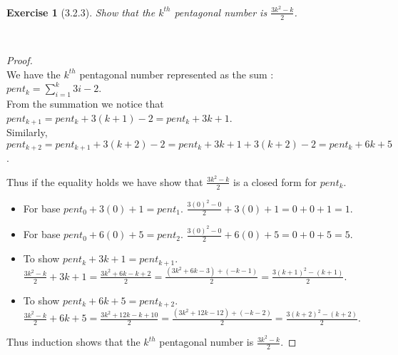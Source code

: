 \documentclass[12pt]{article}
\newcommand{\XB}{\color{black}}
\newcommand{\XBB}{\color{blue}}
\newcommand{\ds}{\displaystyle}
\theoremstyle{plain}
\newtheorem{ex}{Exercise}
\begin{document}
\newpage
\XBB\hrulefill\XB \\
\begin{ex} [3.2.3]
  Show that the $k^{th}$ pentagonal number is $ \ds \frac{3k^{2} - k}{2} $.
\end{ex}
\XBB\hrulefill\XB \\

\begin{proof}
  \ \\

  We have the $k^{th}$ pentagonal number represented as the sum : $ \ds pent_{k} = \sum_{i = 1}^{k} 3i - 2 $. \\

  From the summation we notice that $ pent_{k + 1} = pent_{k} + 3(k + 1) - 2 = pent_{k} + 3k + 1 $. \\

  Similarly, $ pent_{k + 2} = pent_{k + 1} + 3(k + 2) - 2 = pent_{k} + 3k + 1 + 3(k + 2) - 2 = pent_{k} + 6k + 5 $.

  Thus if the equality holds we have show that $ \ds \frac{3k^{2} - k}{2} $ is a closed form for $ pent_{k} $.

  \begin{itemize}
    \item For base $ pent_{0} + 3(0) + 1 = pent_{1} $.
    \subitem $ \ds \frac{3(0)^{2} - 0}{2} + 3(0) + 1 = 0 + 0 + 1 = 1 $.
    \item For base $ pent_{0} + 6(0) + 5 = pent_{2} $.
    \subitem $ \ds \frac{3(0)^{2} - 0}{2} + 6(0) + 5 = 0 + 0 + 5 = 5 $.
    \item To show $ pent_{k} + 3k + 1 = pent_{k + 1} $.
    \subitem $ \ds \frac{3k^{2} - k}{2} + 3k + 1 = \frac{3k^{2} + 6k -k + 2}{2} = \frac{(3k^{2} +6k -3) + (- k - 1)}{2} = \frac{3(k + 1)^{2} - (k + 1)}{2} $.
    \item To show $ pent_{k} + 6k + 5 = pent_{k + 2} $.
    \subitem $ \ds \frac{3k^{2} - k}{2} + 6k + 5 = \frac{3k^{2} + 12k -k + 10}{2} = \frac{(3k^{2} +12k -12) + (- k - 2)}{2} = \frac{3(k + 2)^{2} - (k + 2)}{2} $.
  \end{itemize}

  Thus induction shows that the $k^{th}$ pentagonal number is $ \ds \frac{3k^{2} - k}{2} $.

\end{proof}
\end{document}
